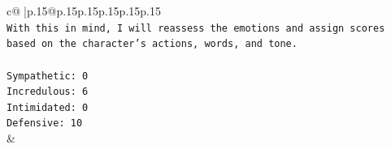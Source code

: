 \documentclass{article}
\begin{document}
{\begin{supertabular}{c@{$\;$}|p{.15\linewidth}@{}p{.15\linewidth}p{.15\linewidth}p{.15\linewidth}p{.15\linewidth}p{.15\linewidth}}
{{{\\ 
\texttt{With this in mind, I will reassess the emotions and assign scores based on the character's actions, words, and tone.} \\
\\ 
\texttt{Sympathetic: 0} \\
\texttt{Incredulous: 6} \\
\texttt{Intimidated: 0} \\
\texttt{Defensive: 10} \\
            }
        }
    }
    & \\ \\

\end{supertabular}
}
\end{document}
